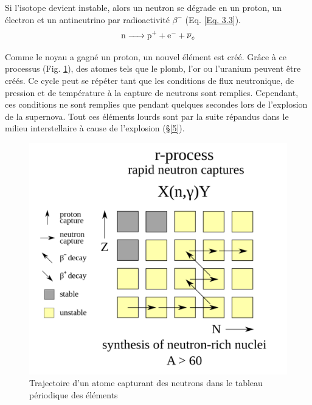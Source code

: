  Si l'isotope devient instable, alors un neutron se dégrade en un proton, un électron et un antineutrino  par radioactivité $\beta^{-}$ (Eq. \ref{Eq. 3.3}).\begin{equation} \ce{n -> \ce{p+} + \ce{e-} + $\overline{\nu}$_{e}}\label{Eq. 3.3} \end{equation}
 
 Comme le noyau a gagné un proton, un nouvel élément est créé. Grâce à ce processus (Fig. \ref{Fig. 3.3}), des atomes tels que le plomb, l'or ou l'uranium peuvent être créés. Ce cycle peut se répéter tant que les conditions de flux neutronique, de pression et de température à la capture de neutrons sont remplies. Cependant, ces conditions ne sont remplies que pendant quelques secondes lors de l'explosion de la supernova. Tout ces éléments lourds sont par la suite répandus dans le milieu interstellaire à cause de l'explosion (§\ref{5}).
 
 \begin{figure}[H]
 	\centering
 	\includegraphics[scale=0.16]{images/processusr}
 	\caption[Trajectoire d'un atome capturant des neutrons dans le tableau périodique des éléments]{Trajectoire d'un atome capturant des neutrons dans le tableau périodique des éléments}
 	\label{Fig. 3.3}
 \end{figure} 

 \vfill



 
 

